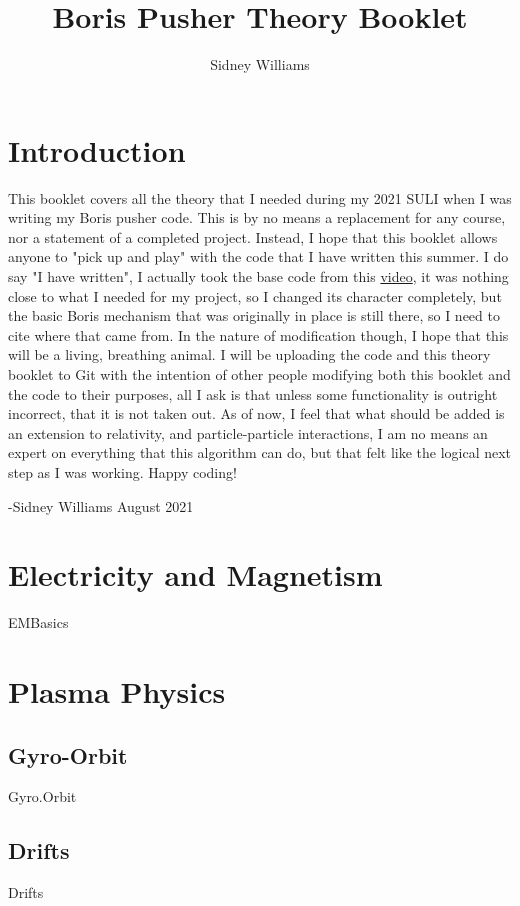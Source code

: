 \documentclass[12pt]{article}
\title{
Boris Pusher Theory Booklet}
\author{Sidney Williams}
\let\oldsection\section
\renewcommand\section{\clearpage\oldsection}
\begin{document}
\maketitle
\tableofcontents
\section{Introduction}

This booklet covers all the theory that I needed during my 2021 SULI when I was writing my Boris pusher code. This is by no means a replacement for any course, nor a statement of a completed project. Instead, I hope that this booklet allows anyone to "pick up and play" with the code that I have written this summer. I do say "I have written", I actually took the base code from this \href{https://www.youtube.com/watch?v=d4NlmGkfagk&t=889s&ab_channel=PyPhy}{video}, it was nothing close to what I needed for my project, so I changed its character completely, but the basic Boris mechanism that was originally in place is still there, so I need to cite where that came from. In the nature of modification though, I hope that this will be a living, breathing animal. I will be uploading the code and this theory booklet to Git with the intention of other people modifying both this booklet and the code to their purposes, all I ask is that unless some functionality is outright incorrect, that it is not taken out. As of now, I feel that what should be added is an extension to relativity, and particle-particle interactions, I am no means an expert on everything that this algorithm can do, but that felt like the logical next step as I was working. Happy coding!

-Sidney Williams August 2021 
\section{Electricity and Magnetism}\cite{Stacey}
{EMBasics}
\section{Plasma Physics}
\subsection{Gyro-Orbit}
{Gyro.Orbit}
\subsection{Drifts}\label{subsecdrifts}
{Drifts}
\end{document}
